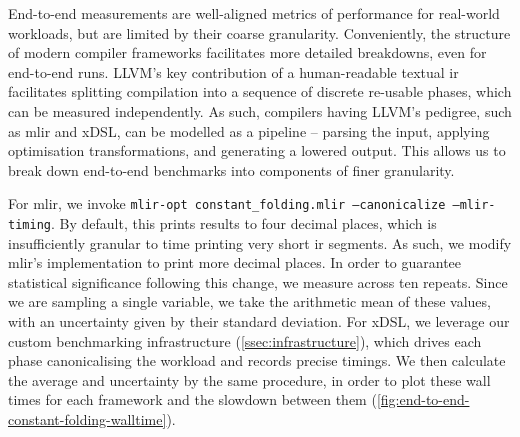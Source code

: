 End-to-end measurements are well-aligned metrics of performance for real-world workloads, but are limited by their coarse granularity. Conveniently, the structure of modern compiler frameworks facilitates more detailed breakdowns, even for end-to-end runs.
LLVM's key contribution of a human-readable textual \ac{ir} facilitates splitting compilation into a sequence of discrete re-usable phases, which can be measured independently. %
As such, compilers having LLVM's pedigree, such as \ac{mlir} and xDSL, can be modelled as a pipeline -- parsing the input, applying optimisation transformations, and generating a lowered output.
This allows us to break down end-to-end benchmarks into components of finer granularity. %

For \ac{mlir}, we invoke \texttt{mlir-opt constant_folding.mlir --canonicalize --mlir-timing}.
By default, this prints results to four decimal places, which is insufficiently granular to time printing very short \ac{ir} segments. As such, we modify \ac{mlir}'s implementation to print more decimal places. In order to guarantee statistical significance following this change, we measure across ten repeats. Since we are sampling a single variable, we take the arithmetic mean of these values, with an uncertainty given by their standard deviation.
For xDSL, we leverage our custom benchmarking infrastructure (\autoref{ssec:infrastructure}), which drives each phase canonicalising the workload and records precise timings.
We then calculate the average and uncertainty by the same procedure, in order to plot these wall times for each framework and the slowdown between them (\autoref{fig:end-to-end-constant-folding-walltime}).

